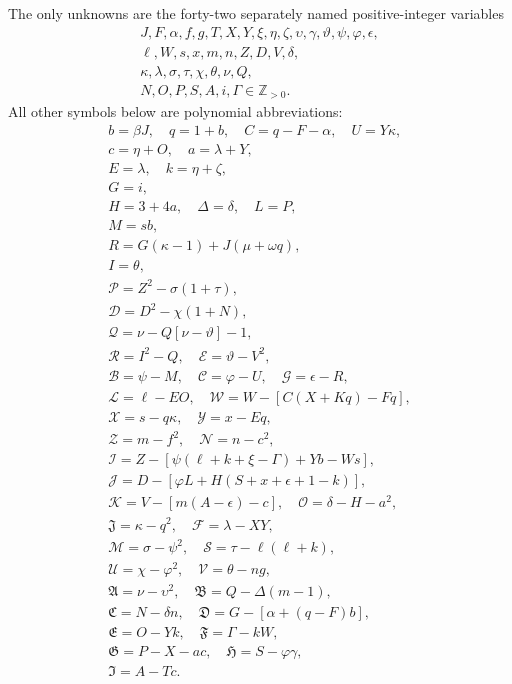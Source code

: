 The only unknowns are the forty-two separately named positive-integer variables
\[
\begin{gathered}J,F,\alpha,f,g,T,X,Y,\xi,\eta,\zeta,\upsilon,\gamma,\vartheta,\psi,\varphi,\epsilon,\\
\ell,W,s,x,m,n,Z,D,V,\delta,\\
\kappa,\lambda,\sigma,\tau,\chi,\theta,\nu,Q,\\
N,O,P,S,A,i,\Gamma\in\mathbb Z_{>0}.\end{gathered}
\]
All other symbols below are polynomial abbreviations:
\[
\begin{gathered}
b=\beta J,\quad q=1+b,\quad C=q-F-\alpha,\quad U=Y\kappa,\\
c=\eta+O,\quad a=\lambda+Y,\\
E=\lambda,\quad k=\eta+\zeta,\\
G=i,\\
H=3+4a,\quad\Delta=\delta,\quad L=P,\\
M=sb,\\
R=G(\kappa-1)+J(\mu+\omega q),\\
I=\theta,\\
\mathcal{P}=Z^2-\sigma(1+\tau),\\
\mathcal{D}=D^2-\chi(1+N),\\
\mathcal{Q}=\nu-Q[\nu-\vartheta]-1,\\
\mathcal{R}=I^2-Q,\quad \mathcal{E}=\vartheta-V^2,\\
\mathcal{B}=\psi-M,\quad \mathcal{C}=\varphi-U,\quad \mathcal{G}=\epsilon-R,\\
\mathcal{L}=\ell-EO,\quad \mathcal{W}=W-[C(X+Kq)-Fq],\\
\mathcal{X}=s-q\kappa,\quad \mathcal{Y}=x-Eq,\\
\mathcal{Z}=m-f^2,\quad \mathcal{N}=n-c^2,\\
\mathcal{I}=Z-[\psi(\ell+k+\xi-\Gamma)+Yb-Ws],\\
\mathcal{J}=D-[\varphi L+H(S+x+\epsilon+1-k)],\\
\mathcal{K}=V-[m(A-\epsilon)-c],\quad\mathcal{O}=\delta-H-a^2,\\
\mathfrak{J}=\kappa-q^2,\quad\mathcal{F}=\lambda-XY,\\
\mathcal{M}=\sigma-\psi^2,\quad\mathcal{S}=\tau-\ell(\ell+k),\\
\mathcal{U}=\chi-\varphi^2,\quad\mathcal{V}=\theta-ng,\\
\mathfrak{A}=\nu-\upsilon^2,\quad\mathfrak{B}=Q-\Delta(m-1),\\
\mathfrak{C}=N-\delta n,\quad\mathfrak{D}=G-[\alpha+(q-F)b],\\
\mathfrak{E}=O-Yk,\quad\mathfrak{F}=\Gamma-kW,\\
\mathfrak{G}=P-X-ac,\quad\mathfrak{H}=S-\varphi\gamma,\\
\mathfrak{I}=A-Tc.
\end{gathered}
\]
